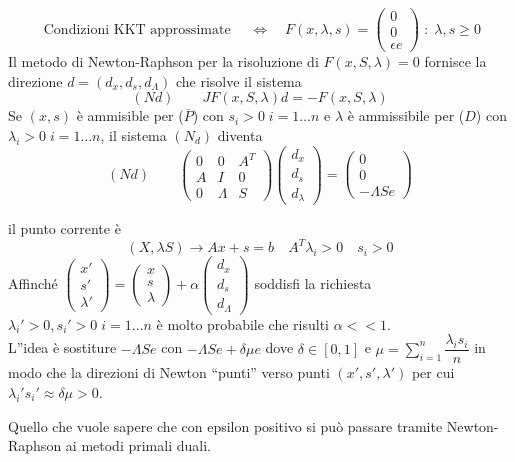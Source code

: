 $$
\text{ Condizioni KKT approssimate } \quad \Longleftrightarrow \quad
 F(x, \lambda , s) =
\begin{pmatrix}
  0 \\
 0 \\
 \epsilon e
\end{pmatrix}\; : \; \lambda, s \geq 0
$$
Il metodo di Newton-Raphson per la risoluzione di $F(x, S, \lambda) = 0$
fornisce la direzione $d = (d_x, d_s, d_{\Lambda})$ che risolve il sistema
$$(Nd) \qquad JF( x, S, \lambda) d = - F(x, S , \lambda)$$
Se $(x,s)$ \`e ammisible per ($\overline{P}$) con $s_i > 0 \; i=1\ldots n$
e $\lambda$ \`e ammissibile per ($D$) con $\lambda_i > 0 \; i = 1\ldots n$,
il sistema $(N_d)$ diventa
$$
(Nd) \qquad
\begin{pmatrix}
  0 & 0 & A^{T}   \\
  A & I & 0  \\
  0 & \Lambda & S 
\end{pmatrix}
\begin{pmatrix}
d_x \\
d_{s} \\
d_{\lambda}
\end{pmatrix}
=
\begin{pmatrix}
  0 \\
  0 \\
 - \Lambda Se
\end{pmatrix}
$$

il punto corrente \`e
$$ (X, \lambda S) \rightarrow Ax +s = b \quad A^{T} \lambda_i > 0
\quad s_i > 0
$$
Affinch\'e
$
\begin{pmatrix}
  x'  \\
 s' \\
 \lambda'
\end{pmatrix}
=
\begin{pmatrix}
  x \\
 s \\
 \lambda 
\end{pmatrix}
+
\alpha
\begin{pmatrix}
  d_x \\
 d_s \\
 d_{\Lambda}
\end{pmatrix}
$
soddisfi la richiesta $\lambda_i' > 0, s_i' > 0 \;
i =1 \ldots n$  \`e molto probabile che risulti
$\alpha <<1 $. \\
L''idea \`e sostiture
$ - \Lambda S e$ con $-\Lambda Se + \delta \mu e$
dove $\delta \in [0,1]$ e
$ \mu = \displaystyle \sum_{i=1}^{n} \dfrac{\lambda_i s_i}{n}$
in modo che la direzioni di Newton ``punti'' verso punti
$(x', s', \lambda ')$ per cui $\lambda_i' s_i' \approx \delta \mu > 0$.
\begin{notes}
Quello che vuole sapere che con epsilon positivo si pu\`o passare
tramite Newton-Raphson ai metodi primali duali.
\end{notes}
